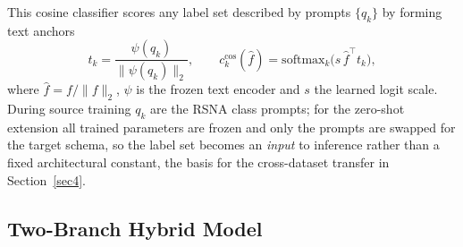 \documentclass[runningheads]{llncs}
\begin{document}
This cosine classifier scores any label set described by prompts $\{q_k\}$ by forming text anchors
\begin{equation}
t_k = \frac{\psi(q_k)}{\|\psi(q_k)\|_2},
\qquad
c^{\text{cos}}_k(\hat f) = \mathrm{softmax}_k\!\big(s\,\hat f^{\top} t_k\big),
\label{eq:cosinehead}
\end{equation}
where $\hat f = f/\|f\|_2$, $\psi$ is the frozen text encoder and $s$ the learned logit scale. During source training $q_k$ are the RSNA class prompts; for the zero-shot extension all trained parameters are frozen and only the prompts are swapped for the target schema, so the label set becomes an \emph{input} to inference rather than a fixed architectural constant, the basis for the cross-dataset transfer in Section~\ref{sec4}.

\subsection{Two-Branch Hybrid Model}\label{wf}
\end{document}
